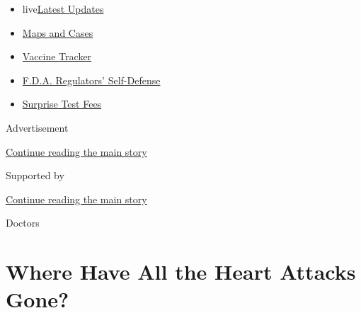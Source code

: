\begin{itemize}
\tightlist
\item
  live\href{https://www.nytimes3xbfgragh.onion/2020/09/11/world/covid-19-coronavirus.html?name=styln-coronavirus-national\&region=TOP_BANNER\&block=storyline_menu_recirc\&action=click\&pgtype=Article\&impression_id=f3bd2300-f4b8-11ea-b9f9-d5e9868d2682\&variant=undefined}{Latest
  Updates}
\item
  \href{https://www.nytimes3xbfgragh.onion/interactive/2020/us/coronavirus-us-cases.html?name=styln-coronavirus-national\&region=TOP_BANNER\&block=storyline_menu_recirc\&action=click\&pgtype=Article\&impression_id=f3bd2301-f4b8-11ea-b9f9-d5e9868d2682\&variant=undefined}{Maps
  and Cases}
\item
  \href{https://www.nytimes3xbfgragh.onion/interactive/2020/science/coronavirus-vaccine-tracker.html?name=styln-coronavirus-national\&region=TOP_BANNER\&block=storyline_menu_recirc\&action=click\&pgtype=Article\&impression_id=f3bd2302-f4b8-11ea-b9f9-d5e9868d2682\&variant=undefined}{Vaccine
  Tracker}
\item
  \href{https://www.nytimes3xbfgragh.onion/2020/09/10/us/politics/fda-coronavirus-vaccine.html?name=styln-coronavirus-national\&region=TOP_BANNER\&block=storyline_menu_recirc\&action=click\&pgtype=Article\&impression_id=f3bd2303-f4b8-11ea-b9f9-d5e9868d2682\&variant=undefined}{F.D.A.
  Regulators' Self-Defense}
\item
  \href{https://www.nytimes3xbfgragh.onion/2020/09/09/upshot/coronavirus-surprise-test-fees.html?name=styln-coronavirus-national\&region=TOP_BANNER\&block=storyline_menu_recirc\&action=click\&pgtype=Article\&impression_id=f3bdbf40-f4b8-11ea-b9f9-d5e9868d2682\&variant=undefined}{Surprise
  Test Fees}
\end{itemize}

Advertisement

\protect\hyperlink{after-top}{Continue reading the main story}

Supported by

\protect\hyperlink{after-sponsor}{Continue reading the main story}

Doctors

\hypertarget{where-have-all-the-heart-attacks-gone}{%
\section{Where Have All the Heart Attacks
Gone?}\label{where-have-all-the-heart-attacks-gone}}

